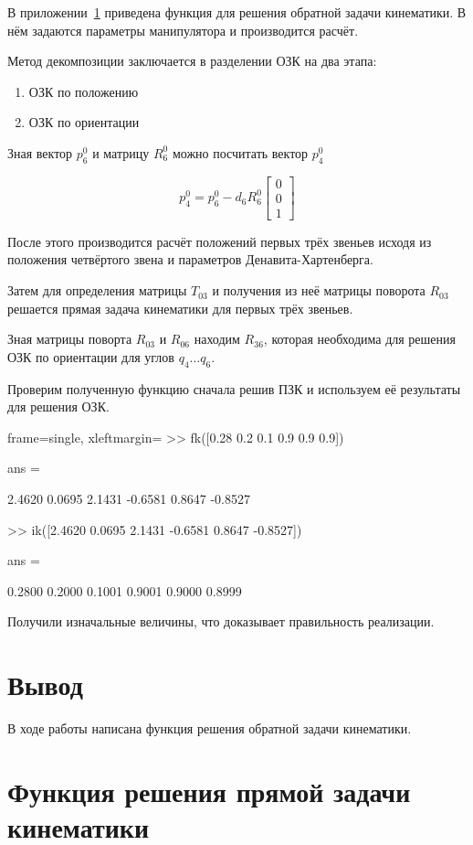 \documentclass[14pt]{extarticle}
\begin{document}
    В приложении~\ref{code:ik} приведена функция для решения обратной задачи кинематики. В нём задаются параметры
    манипулятора и производится расчёт.

    Метод декомпозиции заключается в разделении ОЗК на два этапа:
    \begin{enumerate}
        \item ОЗК по положению
        \item ОЗК по ориентации
    \end{enumerate}

    Зная вектор $p^0_6$ и матрицу $R^0_6$ можно посчитать вектор $p^0_4$

    \begin{equation}
        p^0_4 = p^0_6 - d_6 R^0_6
        \begin{bmatrix}
            0 \\
            0 \\
            1
        \end{bmatrix}
    \end{equation}

    После этого производится расчёт положений первых трёх звеньев исходя из положения четвёртого звена и параметров Денавита-Хартенберга.

    Затем для определения матрицы $T_{03}$ и получения из неё матрицы поворота $R_{03}$ решается прямая задача кинематики для первых трёх звеньев.

    Зная матрицы поворта $R_{03}$ и $R_{06}$ находим $R_{36}$, которая необходима для решения ОЗК по ориентации для углов
    $q_4 \dots q_6$.

    Проверим полученную функцию сначала решив ПЗК и используем её результаты для решения ОЗК.
    \begin{matlabcode*}{frame=single, xleftmargin=\parindent}
        >> fk([0.28 0.2 0.1 0.9 0.9 0.9])

        ans =

            2.4620    0.0695    2.1431   -0.6581    0.8647   -0.8527

        >> ik([2.4620    0.0695    2.1431   -0.6581    0.8647   -0.8527])

        ans =

            0.2800    0.2000    0.1001    0.9001    0.9000    0.8999
    \end{matlabcode*}

    Получили изначальные величины, что доказывает правильность реализации.

    \section*{Вывод}
    В ходе работы написана функция решения обратной задачи кинематики.

    \appendix
    \renewcommand{\thesection}{\Asbuk{section}}
    \section{Функция решения прямой задачи кинематики}\label{code:ik}
\end{document}
